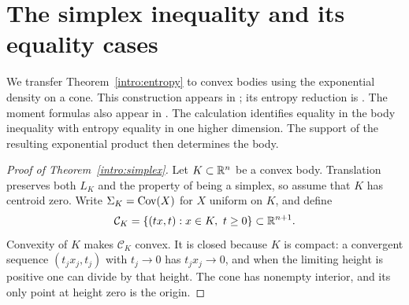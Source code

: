\section{The simplex inequality and its equality cases}\label{sec:geometry}

We transfer Theorem~\ref{intro:entropy} to convex bodies using the exponential
density on a cone. This construction appears in
\cite[Proposition~2(b)]{FradeliziMeyer2008}; its entropy reduction is
\cite[Lemma~5.2 and Proposition~5.2]{FradeliziMarinSola2026}.
The moment formulas also appear in \cite[Lemma~2.5]{Klartag2018}.
The calculation identifies equality in the body inequality with entropy
equality in one higher dimension.  The support of the resulting
exponential product then determines the body.

\begin{proof}[Proof of Theorem~\ref{intro:simplex}]
Let $K\subset\mathbb R^n$ be a convex body.  Translation preserves both $L_K$
and the property of being a simplex, so assume that $K$ has centroid
zero.  Write $\Sigma_K=\operatorname{Cov}(X)$ for $X$ uniform on $K$, and define
\begin{equation}\label{eq:body-cone}
  \mathcal C_K=\{(tx,t):x\in K,\ t\geq0\}\subset\mathbb R^{n+1}.
\end{equation}
Convexity of $K$ makes $\mathcal C_K$ convex.  It is closed because $K$
is compact: a convergent sequence $(t_jx_j,t_j)$ with $t_j\to0$ has
$t_jx_j\to0$, and when the limiting height is positive one can divide
by that height.  The cone has nonempty interior, and its only point
at height zero is the origin.


\end{proof}
